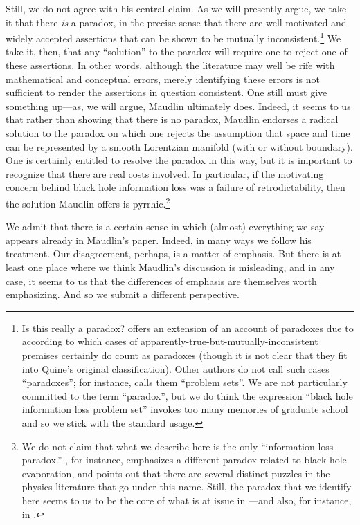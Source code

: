 \documentclass[authoryear,12pt,3p]{jowarticle}
\begin{document}
Still, we do not agree with his central claim.  As we will presently argue, we take it that there \emph{is} a paradox, in the precise sense that there are well-motivated and widely accepted assertions that can be shown to be mutually inconsistent.\footnote{Is this really a paradox?  \citet{lycan2010exactly} offers an extension of an account of paradoxes due to \citet{Quine} according to which cases of apparently-true-but-mutually-inconsistent premises  certainly do count as paradoxes (though it is not clear that they fit into Quine's original classification). Other authors do not call such cases ``paradoxes''; for instance, \citet{mcgrath2007four} calls them ``problem sets''.  We are not particularly committed to the term ``paradox'', but we do think the expression ``black hole information loss problem set'' invokes too many memories of graduate school and so we stick with the standard usage.}  We take it, then, that any ``solution'' to the paradox will require one to reject one of these assertions.  In other words, although the literature may well be rife with mathematical and conceptual errors, merely identifying these errors is not sufficient to render the assertions in question consistent.  One still must give something up---as, we will argue, Maudlin ultimately does.  Indeed, it seems to us that rather than showing that there is no paradox, Maudlin endorses a radical solution to the paradox on which one rejects the assumption that space and time can be represented by a smooth Lorentzian manifold (with or without boundary).  One is certainly entitled to resolve the paradox in this way, but it is important to recognize that there are real costs involved.  In particular, if the motivating concern behind black hole information loss was a failure of retrodictability, then the solution Maudlin offers is pyrrhic.\footnote{We do not claim that what we describe here is the only ``information loss paradox.''  \citet{Wallace}, for instance, emphasizes a different paradox related to black hole evaporation, and points out that there are several distinct puzzles in the physics literature that go under this name.  Still, the paradox that we identify here seems to us to be the core of what is at issue in \citet{Maudlin}---and also, for instance, in \citet{Unruh+Wald}.}

We admit that there is a certain sense in which (almost) everything we say appears already in Maudlin's paper.  Indeed, in many ways we follow his treatment.  Our disagreement, perhaps, is a matter of emphasis.  But there is at least one place where we think Maudlin's discussion is misleading, and in any case, it seems to us that the differences of emphasis are themselves worth emphasizing.  And so we submit a different perspective.
\end{document}
